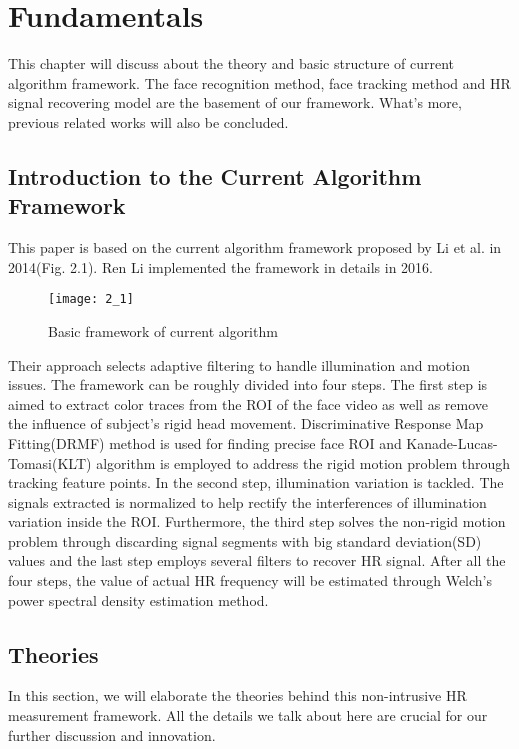 \chapter{Fundamentals}
This chapter will discuss about the theory and basic structure of current algorithm framework. The face recognition method, face tracking method and HR signal recovering model are the basement of our framework. What's more, previous related works will also be concluded.

\section{Introduction to the Current Algorithm Framework}
This paper is based on the current algorithm framework proposed by Li et al. in 2014\cite{li2014remote}(Fig. 2.1). Ren Li implemented the framework in details in 2016.

\begin{figure}[ht]
\centering
\texttt{[image: 2\_1]}
\caption{Basic framework of current algorithm}\label{fig:noted-figure}
\end{figure}

Their approach selects adaptive filtering to handle illumination and motion issues. The framework can be roughly divided into four steps. The first step is aimed to extract color traces from the ROI of the face video as well as remove the influence of subject's rigid head movement. Discriminative Response Map Fitting(DRMF) method\cite{asthana2013robust} is used for finding precise face ROI and Kanade-Lucas-Tomasi(KLT) algorithm\cite{tomasi1991detection} is employed to address the rigid motion problem through tracking feature points. In the second step, illumination variation is tackled. The signals extracted is normalized to help rectify the interferences of illumination variation inside the ROI. Furthermore, the third step solves the non-rigid motion problem through discarding signal segments with big standard deviation(SD) values and the last step employs several filters to recover HR signal. After all the four steps, the value of actual HR frequency will be  estimated through Welch's power spectral density estimation method\cite{welch1967use}. 

\section{Theories}
In this section, we will elaborate the theories behind this non-intrusive HR measurement framework. All the details we talk about here are crucial for our further discussion and innovation.

